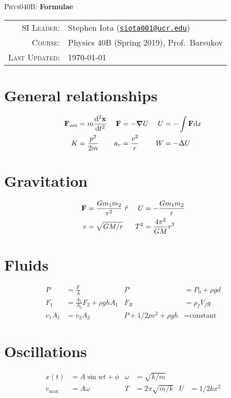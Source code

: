 \documentclass[10pt]{article}
\newcommand{\email}[1]{\texttt{\href{mailto:#1}{#1}}}
\begin{document}
\begin{center}

\Large{\textsc{Phys040B}: \textbf{Formulae}}
\end{center}
\vspace{.5mm}



\begin{tabular}{rl}
\textsc{SI Leader}:
&
Stephen Iota (\email{siota001@ucr.edu})
\\
\textsc{Course}:
&
Physics 40B (Spring 2019), Prof.~Barsukov
\\
\textsc{Last Updated}:
&
\today
\end{tabular}


\section{General relationships}

\begin{align*}
\vb{F}_{\text{net}} &= m\dv[2]{\vb{x}}{t}
&
\vb{F} &= -\grad{U}
&
U &= -\int \vb{F} \text{d}x
\\
K &= \frac{p^2}{2m}
&
a_r &= \frac{v^2}{r}
&
W &= -\Delta U
\end{align*}



\section{Gravitation}

\begin{align*}
\vb{F} &= \frac{Gm_1m_2}{r^2} \ \hat{r}
&
U &= -\frac{Gm_1m_2}{r}
\\
v &= \sqrt{GM/r}
&
T^2 &= \frac{4\pi^2}{GM}r^3
\\
\end{align*}




\section{Fluids}


\begin{align*}
P &= \frac{F}{A}
&
P &= P_0 + \rho gd
\\
F_1 &= \frac{A_1}{A_2} F_2 + \rho ghA_1
&
F_B &= \rho_f V_fg
\\
v_1A_1 &= v_2A_2
&
P + 1/2\rho v^2 + \rho gh &= \text{constant}
\end{align*}




\section{Oscillations}

\begin{align*}
x(t) &= A\sin{wt+\phi}
&
\omega &= \sqrt{k/m}
\\
v_{\text{max}} &= A\omega
&
T &= 2\pi \sqrt{m/k}
&
U &= 1/2kx^2
\end{align*}
\end{document}
